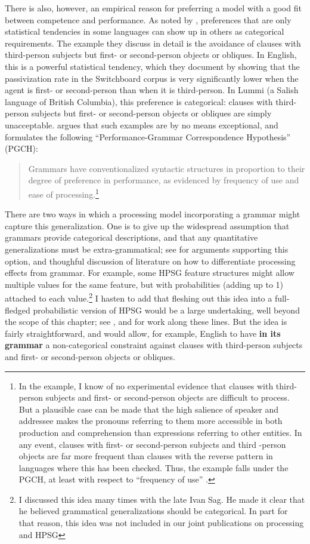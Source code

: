 \documentclass[a4paper]{article}
\begin{document}
There is also, however, an empirical reason for preferring a model with a good fit between competence and performance.  As noted by \citet{BresnanEtAl2001}, preferences that are only statistical tendencies in some languages can show up in others as categorical requirements.  The example they discuss in detail is the avoidance of clauses with third-person subjects but first- or second-person objects or obliques. In English, this is a powerful statistical tendency, which they document by showing that the passivization rate in the Switchboard corpus is very significantly lower when the agent is first- or second-person than when it is third-person.  In Lummi (a Salish language of British Columbia), this preference is categorical:  clauses with third-person subjects but first- or second-person objects or obliques are simply unacceptable.  \citet{Hawkins2004a-u,Hawkins2014} argues that such examples are by no means exceptional, and formulates the following ``Performance-Grammar Correspondence Hypothesis'' (PGCH):
\begin{quote}
Grammars  have  conventionalized  syntactic  structures  in  proportion   to their degree of preference in performance, as evidenced by frequency of use and ease of processing.\footnote {In the \citeauthor{BresnanEtAl2001} example, I know of no experimental evidence that clauses with third-person subjects and first- or second-person objects are difficult to process.  But a plausible case can be made that the high salience of speaker and addressee makes the pronouns referring to them more accessible in both production and comprehension than expressions referring to other entities.  In any event, clauses with first- or second-person subjects and third -person objects are far more frequent than clauses with the reverse pattern in languages where this has been checked.  Thus, the \citeauthor{BresnanEtAl2001} example falls under the PGCH, at least with respect to ``frequency of use'' .}
\end{quote}
There are two ways in which a processing model incorporating a grammar might capture this generalization.  One is to give up the widespread assumption that grammars provide categorical descriptions, and that any quantitative generalizations must be extra-grammatical; see \citet{FrancisPrep} for arguments supporting this option, and thoughful discussion of literature on how to differentiate processing effects from grammar.  For example, some HPSG feature structures might allow multiple values for the same feature, but with probabilities (adding up to 1) attached to each value.\footnote{I discussed this idea many times with the late Ivan Sag.  He made it clear that he believed grammatical generalizations should be categorical.  In part for that reason, this idea was not included in our joint publications on processing and HPSG}  I hasten to add that fleshing out this idea into a full-fledged probabilistic version of HPSG would be a large undertaking, well beyond the scope of this chapter; see \citet{Linadarki2006}, and \citet{MT2008a-u} for work along these lines.  But the idea is fairly straightforward, and would allow, for example, English to have {\bf in its grammar} a non-categorical constraint against clauses with third-person subjects and first- or second-person objects or obliques.  
\end{document}
